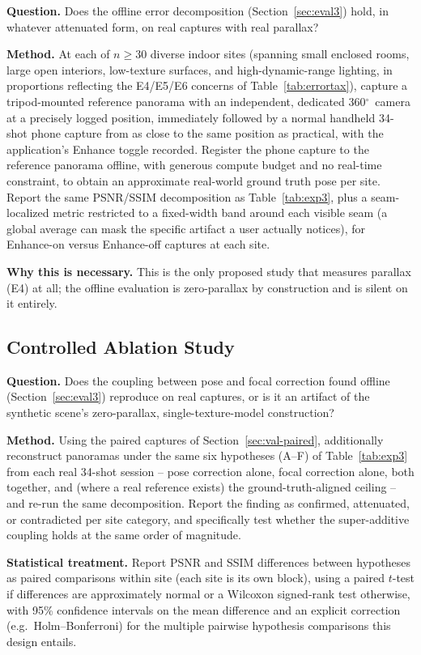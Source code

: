 \documentclass[11pt]{article}
\newcommand{\Deg}{\ensuremath{^{\circ}}}
\begin{document}
\textbf{Question.} Does the offline error decomposition (Section~\ref{sec:eval3}) hold, in whatever attenuated form, on real captures with real parallax?

\textbf{Method.} At each of $n \ge 30$ diverse indoor sites (spanning small enclosed rooms, large open interiors, low-texture surfaces, and high-dynamic-range lighting, in proportions reflecting the E4/E5/E6 concerns of Table~\ref{tab:errortax}), capture a tripod-mounted reference panorama with an independent, dedicated 360\Deg\ camera at a precisely logged position, immediately followed by a normal handheld 34-shot phone capture from as close to the same position as practical, with the application's Enhance toggle recorded. Register the phone capture to the reference panorama offline, with generous compute budget and no real-time constraint, to obtain an approximate real-world ground truth pose per site. Report the same PSNR/SSIM decomposition as Table~\ref{tab:exp3}, plus a seam-localized metric restricted to a fixed-width band around each visible seam (a global average can mask the specific artifact a user actually notices), for Enhance-on versus Enhance-off captures at each site.

\textbf{Why this is necessary.} This is the only proposed study that measures parallax (E4) at all; the offline evaluation is zero-parallax by construction and is silent on it entirely.

\subsection{Controlled Ablation Study}
\label{sec:val-ablation}

\textbf{Question.} Does the coupling between pose and focal correction found offline (Section~\ref{sec:eval3}) reproduce on real captures, or is it an artifact of the synthetic scene's zero-parallax, single-texture-model construction?

\textbf{Method.} Using the paired captures of Section~\ref{sec:val-paired}, additionally reconstruct panoramas under the same six hypotheses (A--F) of Table~\ref{tab:exp3} from each real 34-shot session -- pose correction alone, focal correction alone, both together, and (where a real reference exists) the ground-truth-aligned ceiling -- and re-run the same decomposition. Report the finding as confirmed, attenuated, or contradicted per site category, and specifically test whether the super-additive coupling holds at the same order of magnitude.

\textbf{Statistical treatment.} Report PSNR and SSIM differences between hypotheses as paired comparisons within site (each site is its own block), using a paired $t$-test if differences are approximately normal or a Wilcoxon signed-rank test otherwise, with 95\% confidence intervals on the mean difference and an explicit correction (e.g.\ Holm--Bonferroni) for the multiple pairwise hypothesis comparisons this design entails.
\end{document}
